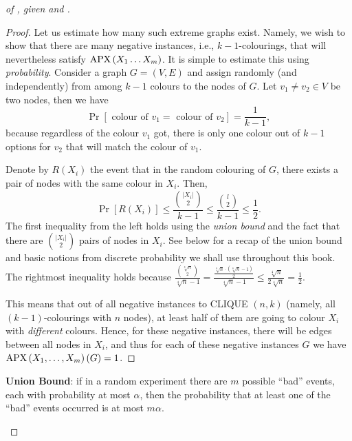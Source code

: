 \begin{proof}[of , given   and ]
\begin{proof}
Let us  estimate  how many such extreme graphs exist. 
Namely, we wish to show that there are many negative instances, i.e., $k-1$-colourings, that will nevertheless satisfy  
$\operatorname{\mathrm{APX}}\left(X_1 \ldots X_m\right)$.
It is simple to estimate this using \emph{probability}. Consider a graph $G=(V, E)$ and  assign randomly (and independently) from among $k-1$ colours to the nodes of $G$. Let $v_1 \neq v_2 \in V$ be two nodes, then we  have
$$
\operatorname{Pr}\left[\text { colour of } v_1=\text { colour of } v_2\right]=\frac{1}{k-1},
$$
because regardless of the colour $v_1$ got, there is only one colour out of $k-1$ options for $v_2$ that will match the colour of $v_1$.

Denote by $R\left(X_i\right)$ the event that in the random colouring of $G$, there exists a pair of nodes with the same colour in $X_i$.
Then, 
$$
\operatorname{Pr}\left[R\left(X_i\right)\right] \leq \frac{\binom{|X_i |}{2}}{k-1} \leq \frac{\binom{l}{2}}{k-1} \leq \frac{1}{2}.
$$
The first inequality from the left holds using the \emph{union bound} and the fact that there are $\binom{\mid X_i |}{2}$ pairs
of nodes in $X_i$. See below for a recap of the union bound and basic notions from discrete probability we shall use throughout this book.
The rightmost inequality holds because 
$ \frac{\binom{\sqrt[8]{n}}{2}}{\sqrt[4]{n}-1}
= \frac{\frac{\sqrt[8]{n} \cdot(\sqrt[8]{n}-1)}{2}}{\sqrt[4]{n}-1} \le \frac{\sqrt[4]{n}}{2\sqrt[4]{n}}=\frac{1}{2}.
$



This means that out of all negative instances to CLIQUE $(n, k)$ (namely, all $(k-1)$-colourings with $n$ nodes), at least half of them are going to colour $X_i$ with \emph{different} colours. Hence, for these negative instances, there will be edges between all nodes in $X_i$, and thus for each of these negative instances $G$ we have $\mathrm{APX}\left(X_1, \ldots, X_m\right)(G)=1$.
\end{proof}




\begin{tcolorbox}[colframe=white, colback=blue!4, boxrule=0mm, sharp corners]
\textbf{Union Bound}: if in a random experiment
there are $m$ possible ``bad'' events, each with probability at most $\alpha$, then the probability that at least one of the ``bad'' events occurred is at most $m\alpha$.
\end{tcolorbox}

\begin{tcolorbox}[colframe=white, colback=blue!4, boxrule=0mm, sharp corners]
\small


\end{tcolorbox}
\end{proof}
